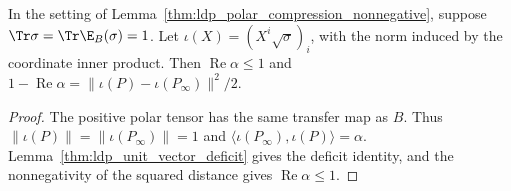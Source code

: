 \begin{lemma}
    \label{thm:ldp_polar_compression_deficit}
    \leanok
    In the setting of Lemma~\ref{thm:ldp_polar_compression_nonnegative},
    suppose $\Tr\sigma=\Tr\E_B(\sigma)=1$. Let
    $\iota(X)=(X^i\sqrt\sigma)_i$, with the norm induced by the coordinate inner product.
    Then $\operatorname{Re}\alpha\le1$ and
    $1-\operatorname{Re}\alpha
        =\lVert\iota(P)-\iota(P_\infty)\rVert^2/2$.
\end{lemma}
\begin{proof}\leanok
    The positive polar tensor has the same transfer map as $B$. Thus
    $\lVert\iota(P)\rVert=\lVert\iota(P_\infty)\rVert=1$ and
    $\langle\iota(P_\infty),\iota(P)\rangle=\alpha$.
    Lemma~\ref{thm:ldp_unit_vector_deficit} gives the deficit identity, and
    the nonnegativity of the squared distance gives $\operatorname{Re}\alpha\le1$.
\end{proof}

